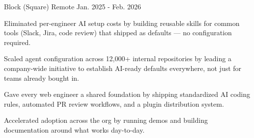 

\begin{cventries}

    {Block (Square)} %
    {Remote} %
    {Jan. 2025 - Feb. 2026} %
    {
      \begin{cvitems}
        \item {Eliminated per-engineer AI setup costs by building reusable skills for common tools (Slack, Jira, code review) that shipped as defaults — no configuration required.}
        \item {Scaled agent configuration across 12,000+ internal repositories by leading a company-wide initiative to establish AI-ready defaults everywhere, not just for teams already bought in.}
        \item {Gave every web engineer a shared foundation by shipping standardized AI coding rules, automated PR review workflows, and a plugin distribution system.}
        \item {Accelerated adoption across the org by running demos and building documentation around what works day-to-day.}
      \end{cvitems}
    }


\end{cventries}
